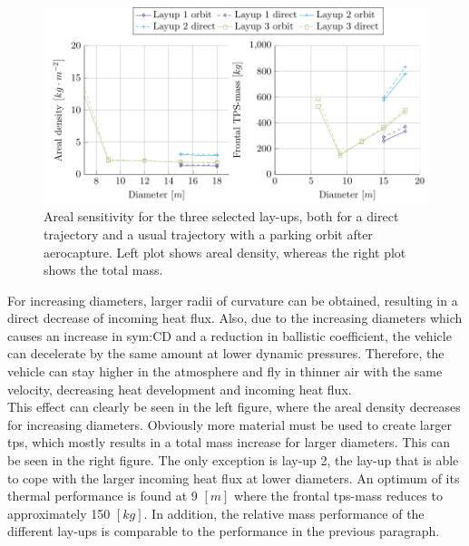 \begin{figure}[h]
	\centering
	\includegraphics{./Figure/Thermal/SensitivityA.pdf}
	\caption[Areal sensitivity for the three selected lay-ups]{Areal sensitivity for the three selected lay-ups, both for a direct trajectory and a usual trajectory with a parking orbit after aerocapture. Left plot shows areal density, whereas the right plot shows the total mass.}
	\label{fig:sensitivityA}
\end{figure}

For increasing diameters, larger radii of curvature can be obtained, resulting in a direct decrease of incoming heat flux. Also, due to the increasing diameters which causes an increase in \gls{sym:CD} and a reduction in ballistic coefficient, the vehicle can decelerate by the same amount at lower dynamic pressures. Therefore, the vehicle can stay higher in the atmosphere and fly in thinner air with the same velocity, decreasing heat development and incoming heat flux.\\

This effect can clearly be seen in the left figure, where the areal density decreases for increasing diameters. Obviously more material must be used to create larger \gls{tps}, which mostly results in a total mass increase for larger diameters. This can be seen in the right figure. The only exception is lay-up 2, the lay-up that is able to cope with the larger incoming heat flux at lower diameters. An optimum of its thermal performance is found at 9 $ \left[ m \right]$ where the frontal \gls{tps}-mass reduces to approximately 150 $ \left[ kg \right]$. In addition, the relative mass performance of the different lay-ups is comparable to the performance in the previous paragraph.

